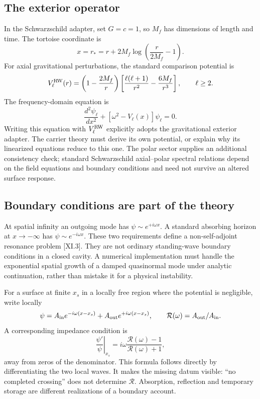 \subsection{The exterior operator}
In the Schwarzschild adapter, set $G=c=1$, so $M_f$ has dimensions of length and time. The tortoise coordinate is
\begin{equation}
 x=r_* =r+2M_f\log\left(\frac{r}{2M_f}-1\right).
 \label{c11:tortoise}
\end{equation}
For axial gravitational perturbations, the standard comparison potential is
\begin{equation}
 V_\ell^{\rm RW}(r)=\left(1-\frac{2M_f}{r}\right)
 \left[\frac{\ell(\ell+1)}{r^2}-\frac{6M_f}{r^3}\right],
 \qquad \ell\geq2.
 \label{c11:rw}
\end{equation}
The frequency-domain equation is
\begin{equation}
 \frac{d^2\psi_\ell}{dx^2}
 +\left[\omega^2-V_\ell(x)\right]\psi_\ell=0.
 \label{c11:eigenproblem}
\end{equation}
Writing this equation with $V_\ell^{\rm RW}$ explicitly adopts the gravitational exterior adapter. The carrier theory must derive its own potential, or explain why its linearized equations reduce to this one. The polar sector supplies an additional consistency check; standard Schwarzschild axial--polar spectral relations depend on the field equations and boundary conditions and need not survive an altered surface response.

\subsection{Boundary conditions are part of the theory}
At spatial infinity an outgoing mode has $\psi\sim e^{+i\omega x}$. A standard absorbing horizon at $x\to-\infty$ has $\psi\sim e^{-i\omega x}$. These two requirements define a non-self-adjoint resonance problem [XI.3]. They are not ordinary standing-wave boundary conditions in a closed cavity. A numerical implementation must handle the exponential spatial growth of a damped quasinormal mode under analytic continuation, rather than mistake it for a physical instability.

For a surface at finite $x_s$ in a locally free region where the potential is negligible, write locally
\begin{equation}
 \psi=A_{\rm in}e^{-i\omega(x-x_s)}
       +A_{\rm out}e^{+i\omega(x-x_s)},\qquad
 \mathcal R(\omega)=A_{\rm out}/A_{\rm in}.
 \label{c11:reflectivity}
\end{equation}
A corresponding impedance condition is
\begin{equation}
 \left.\frac{\psi'}{\psi}\right|_{x_s}
 =i\omega\frac{\mathcal R(\omega)-1}{\mathcal R(\omega)+1},
 \label{c11:impedance}
\end{equation}
away from zeros of the denominator. This formula follows directly by differentiating the two local waves. It makes the missing datum visible: ``no completed crossing'' does not determine $\mathcal R$. Absorption, reflection and temporary storage are different realizations of a boundary account.

